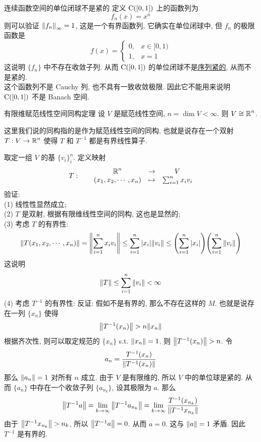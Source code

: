         \begin{cxmp}
            {连续函数空间的单位闭球不是紧的}
            定义 \(\operatorname{\mathrm{C}}([0,1])\) 上的函数列为
            \[f_n(x) = x^n\]
            则可以验证 \(\norm{f_n}_\infty=1\), 这是一个有界函数列, 它确实在单位闭球中, 但 \(f_n\) 的极限函数是
            \[f(x) = \begin{cases}
                0, & x\in[0,1) \\
                1, & x=1
            \end{cases}\]
            这说明 \(\{f_n\}\) 中不存在收敛子列. 从而 \(\operatorname{\mathrm{C}}([0,1])\) 的单位闭球不是\hyperref[dfn:sequential-compact]{序列紧的}, 从而不是紧的.\\
            这个函数列不是 Cauchy 列, 也不具有一致收敛极限. 因此它不能用来说明 \(\operatorname{\mathrm{C}}([0,1])\) 不是 Banach 空间.
        \end{cxmp}

        \begin{thm}
            {有限维赋范线性空间同构定理}
            设 \(V\) 是赋范线性空间, \(n=\dim V<\infty\). 则 \(V\cong\operatorname{\mathbb{R}}^n\).
        \end{thm}

        \begin{rmk}
            [Dedicatia]
            这里我们说的同构指的是作为赋范线性空间的同构, 也就是说存在一个双射 \(T:V\to\operatorname{\mathbb{R}}^n\) 使得 \(T\) 和 \(T^{-1}\) 都是有界线性算子. 
        \end{rmk}

        \begin{prf}
            取定一组 \(V\) 的基 \(\{v_i\}_i^n\). 定义映射
            \[T:\qquad\begin{matrix}
                \operatorname{\mathbb{R}}^n & \to & V \\
                (x_1, x_2, \cdots, x_n) & \mapsto & \sum_{i=1}^n x_i v_i
            \end{matrix}\]
            验证:\\
            (1) 线性性显然成立;\\
            (2) \(T\) 是双射, 根据有限维线性空间的同构, 这也是显然的;\\
            (3) 考虑 \(T\) 的有界性:
            \[\norm{T(x_1, x_2, \cdots, x_n)}=\norm{\sum_{i=1}^n x_i v_i}\leq\sum_{i=1}^n|x_i|\norm{v_i}\leq\qty(\sum_{i=1}^n\abs{x_i})\qty(\sum_{i=1}^n\norm{v_i})  \]
            这说明
            \[\norm{T}\leq\sum_{i=1}^n\norm{v_i}<\infty\]
            (4) 考虑 \(T^{-1}\) 的有界性: 反证: 假如不是有界的, 那么不存在这样的 \(M\). 也就是说存在一列 \(\{x_n\}\) 使得
            \[\norm{T^{-1}(x_n)}>n\norm{x_n}\]
            根据齐次性, 则可以取定规范的 \(\{x_n\}\) s.t. \(\norm{x_n}=1\). 则 \(\norm{T^{-1}(x_n)}>n\). 令
            \[a_n = \frac{T^{-1}(x_n)}{\norm{T^{-1}(x_n)}}\]
            那么 \(\norm{a_n}=1\) 对所有 \(n\) 成立. 由于 \(V\) 是有限维的, 所以 \(V\) 中的单位球是紧的. 从而 \(\{a_n\}\) 中存在一个收敛子列 \(\{a_{n_k}\}\), 设其极限为 \(a\). 那么
            \[\norm{T^{-1}a} = \lim_{k \to \infty} \norm{T^{-1}a_{n_k}} = \lim_{k \to \infty} \frac{T^{-1}(x_{n_k})}{\norm{T^{-1}x_{n_k}}}\]
            由于 \(\norm{T^{-1}x_{n_k}}>n_k\), 所以 \(\norm{T^{-1}a}=0\). 从而 \(a=0\). 这与 \(\norm{a}=1\) 矛盾. 因此 \(T^{-1}\) 是有界的.
        \end{prf}

